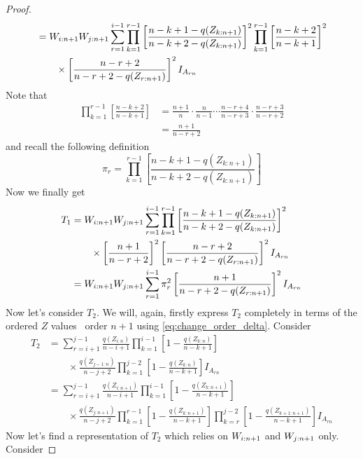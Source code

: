 \begin{proof}
\begin{align*}
	&= W_{i:n+1}W_{j:n+1}\sum\limits_{r=1}^{i-1}\prod_{k=1}^{r-1} \left[ \frac{n-k+1-q(Z_{k:n+1})}{n-k+2-q(Z_{k:n+1})}\right]^2\prod_{k=1}^{r-1} \left[ \frac{n-k+2}{n-k+1}\right]^2\\
	& \qquad \times \left[ \frac{n-r+2}{n-r+2-q(Z_{r:n+1})}\right]^2I_{A_{rn}}\\
\end{align*}
%
Note that 
\begin{align}
\prod_{k=1}^{r-1}\left[\frac{n-k+2}{n-k+1}\right] &= \frac{n+1}{n} \cdot \frac{n}{n-1} \cdots \frac{n-r+4}{n-r+3} \cdot \frac{n-r+3}{n-r+2}\nonumber\\
&= \frac{n+1}{n-r+2}
\label{eq:telescope_prod}
\end{align}
%
and recall the following definition
\begin{equation*}
	\pi_r = \prod_{k=1}^{r-1} \left[ \frac{n-k+1-q(Z_{k:n+1})}{n-k+2-q(Z_{k:n+1})}\right]
\end{equation*}
Now we finally get	
\begin{align*}		
	T_1 &= W_{i:n+1}W_{j:n+1}\sum\limits_{r=1}^{i-1}\prod_{k=1}^{r-1} \left[ \frac{n-k+1-q(Z_{k:n+1})}{n-k+2-q(Z_{k:n+1})}\right]^2\\
	& \qquad \times\left[\frac{n+1}{n-r+2}\right]^2 \left[ \frac{n-r+2}{n-r+2-q(Z_{r:n+1})}\right]^2I_{A_{rn}}\\
	&= W_{i:n+1}W_{j:n+1}\sum\limits_{r=1}^{i-1}\pi_r^2 \left[ \frac{n+1}{n-r+2-q(Z_{r:n+1})}\right]^2I_{A_{rn}}\\
\end{align*}
%
Now let's consider $T_2$. We will, again, firstly express $T_2$ completely in terms of the ordered $Z$ values \wrt\ order $n+1$ using \eqref{eq:change_order_delta}. Consider
\begin{align*}
T_2 &= \sum\limits_{r=i+1}^{j-1} \frac{q(Z_{i:n})}{n-i+1} \prod\limits_{k=1}^{i-1}\left[1-\frac{q(Z_{k:n})}{n-k+1}\right]\\
    & \qquad \times \frac{q(Z_{j-1:n})}{n-j+2} \prod\limits_{k=1}^{j-2}\left[1-\frac{q(Z_{k:n})}{n-k+1}\right]I_{A_{rn}}\\
	&= \sum\limits_{r=i+1}^{j-1} \frac{q(Z_{i:n+1})}{n-i+1} \prod_{k=1}^{i-1}\left[1-\frac{q(Z_{k:n+1})}{n-k+1}\right]\\
	& \qquad \times \frac{q(Z_{j:n+1})}{n-j+2} \prod_{k=1}^{r-1}\left[1-\frac{q(Z_{k:n+1})}{n-k+1}\right]\prod_{k=r}^{j-2}\left[1-\frac{q(Z_{k+1:n+1})}{n-k+1}\right]I_{A_{rn}}
\end{align*}
%
Now let's find a representation of $T_2$ which relies on $W_{i:n+1}$ and $W_{j:n+1}$ only. Consider

\end{proof}
